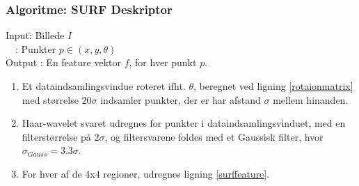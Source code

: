\subsubsection*{Algoritme: SURF Deskriptor}
\begin{tabbing}
Input\quad \= : \= Billede $I$\\
$\text{ }$ \> : \> Punkter $p \in (x, y, \theta)$ \\
Output \text{ } \> : \> En feature vektor $f$, for hver punkt $p$.
\end{tabbing}
\begin{enumerate}
\item Et dataindsamlingsvindue roteret ifht. $\theta$, beregnet ved ligning \eqref{rotaionmatrix} med størrelse $20\sigma$ indsamler punkter, der er har afstand $\sigma$ mellem hinanden.
\item Haar-wavelet svaret udregnes for punkter i dataindsamlingsvinduet, med en filterstørrelse på $2\sigma$, og filtersvarene foldes med et Gaussisk filter, hvor $\sigma_{Gauss} = 3.3\sigma$.
\item For hver af de 4x4 regioner, udregnes ligning \eqref{surffeature}.
\end{enumerate}